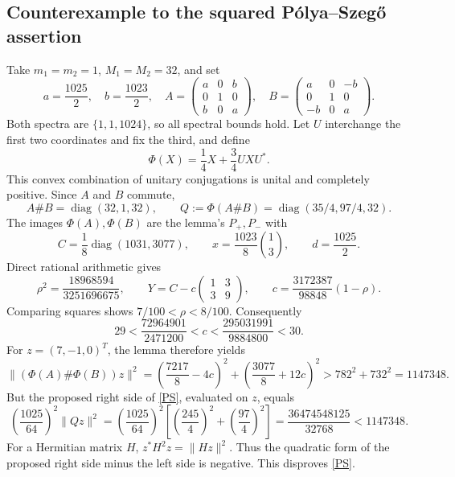 \documentclass[11pt]{article}
\begin{document}
\subsection*{Counterexample to the squared P\'olya--Szeg\H{o} assertion}
Take $m_1=m_2=1$, $M_1=M_2=32$, and set
\[
 a=\frac{1025}{2},\quad b=\frac{1023}{2},\quad
 A=\begin{pmatrix}a&0&b\\0&1&0\\b&0&a\end{pmatrix},\quad
 B=\begin{pmatrix}a&0&-b\\0&1&0\\-b&0&a\end{pmatrix}.
\]
Both spectra are $\{1,1,1024\}$, so all spectral bounds hold.
Let $U$ interchange the first two coordinates and fix the third, and define
\[
 \Phi(X)=\frac14 X+\frac34 UXU^*.
\]
This convex combination of unitary conjugations is unital and completely
positive. Since $A$ and $B$ commute,
\[
 A\#B=\operatorname{diag}(32,1,32),\qquad
 Q:=\Phi(A\#B)=\operatorname{diag}(35/4,97/4,32).
\]
The images $\Phi(A),\Phi(B)$ are the lemma's $P_+,P_-$ with
\[
 C=\frac18\operatorname{diag}(1031,3077),\qquad
 x=\frac{1023}{8}\binom{1}{3},\qquad d=\frac{1025}{2}.
\]
Direct rational arithmetic gives
\[
 \rho^2=\frac{18968594}{3251696675},\qquad
 Y=C-c\begin{pmatrix}1&3\\3&9\end{pmatrix},\qquad
 c=\frac{3172387}{98848}(1-\rho).
\]
Comparing squares shows $7/100<\rho<8/100$. Consequently
\[
 29<\frac{72964901}{2471200}<c
 <\frac{295031991}{9884800}<30.
\]
For $z=(7,-1,0)^T$, the lemma therefore yields
\[
 \|(\Phi(A)\#\Phi(B))z\|^2
 =\left(\frac{7217}{8}-4c\right)^2
  +\left(\frac{3077}{8}+12c\right)^2
 >782^2+732^2=1147348.
\]
But the proposed right side of \eqref{PS}, evaluated on $z$, equals
\[
 \left(\frac{1025}{64}\right)^2\|Qz\|^2
 =\left(\frac{1025}{64}\right)^2
   \left[\left(\frac{245}{4}\right)^2+
         \left(\frac{97}{4}\right)^2\right]
 =\frac{36474548125}{32768}<1147348.
\]
For a Hermitian matrix $H$, $z^*H^2z=\|Hz\|^2$.
Thus the quadratic form of the proposed right side minus the left side
is negative. This disproves \eqref{PS}.

\newpage
\end{document}
